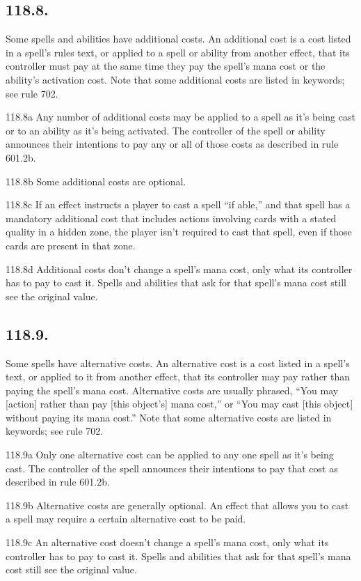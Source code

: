 \subsection*{118.8.}
Some spells and abilities have additional costs. An additional cost is a cost listed in a spell’s rules text, or applied to a spell or ability from another effect, that its controller must pay at the same time they pay the spell’s mana cost or the ability’s activation cost. Note that some additional costs are listed in keywords; see rule 702.

118.8a Any number of additional costs may be applied to a spell as it’s being cast or to an ability as it’s being activated. The controller of the spell or ability announces their intentions to pay any or all of those costs as described in rule 601.2b.

118.8b Some additional costs are optional.

118.8c If an effect instructs a player to cast a spell “if able,” and that spell has a mandatory additional cost that includes actions involving cards with a stated quality in a hidden zone, the player isn’t required to cast that spell, even if those cards are present in that zone.

118.8d Additional costs don’t change a spell’s mana cost, only what its controller has to pay to cast it. Spells and abilities that ask for that spell’s mana cost still see the original value.

\subsection*{118.9.}
Some spells have alternative costs. An alternative cost is a cost listed in a spell’s text, or applied to it from another effect, that its controller may pay rather than paying the spell’s mana cost. Alternative costs are usually phrased, “You may [action] rather than pay [this object’s] mana cost,” or “You may cast [this object] without paying its mana cost.” Note that some alternative costs are listed in keywords; see rule 702.

118.9a Only one alternative cost can be applied to any one spell as it’s being cast. The controller of the spell announces their intentions to pay that cost as described in rule 601.2b.

118.9b Alternative costs are generally optional. An effect that allows you to cast a spell may require a certain alternative cost to be paid.

118.9c An alternative cost doesn’t change a spell’s mana cost, only what its controller has to pay to cast it. Spells and abilities that ask for that spell’s mana cost still see the original value.

